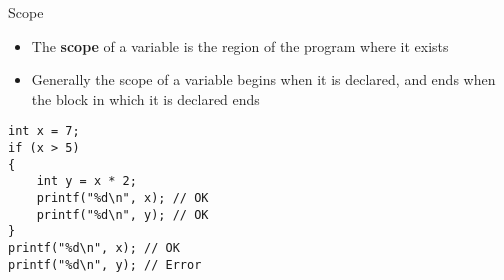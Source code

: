 \begin{frame}[fragile]{Scope}
	\begin{itemize}
		\item The \textbf{scope} of a variable is the region of the program where it exists \pause
		\item Generally the scope of a variable begins when it is declared,
		and ends when the block in which it is declared ends \pause
	\end{itemize}
	\begin{lstlisting}
int x = 7;
if (x > 5)
{
    int y = x * 2;
    printf("%d\n", x); // OK
    printf("%d\n", y); // OK
}
printf("%d\n", x); // OK
printf("%d\n", y); // Error
	\end{lstlisting}
\end{frame}
